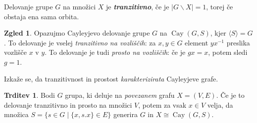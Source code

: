 \documentclass[11pt]{book}
\DeclareMathOperator\Cay{Cay}
\def\definicija{\color{rdeca}\bf\em}
\theoremstyle{definition}
\theoremstyle{zgled}
\newtheorem*{zgled}{Zgled}
\theoremstyle{odprtproblem}
\theoremstyle{domacanaloga}
\theoremstyle{izrek}
\newtheorem*{trditev}{Trditev}
\begin{document}
Delovanje grupe $G$ na množici $X$ je {\definicija tranzitivno}, če je $|G \backslash X| = 1$, torej če obstaja ena sama orbita.

\begin{zgled}
Opazujmo Cayleyjevo delovanje grupe $G$ na $\Cay(G,S)$, kjer $\langle S \rangle = G$. To delovanje je vselej {\em tranzitivno na vozliščih}: za $x,y \in G$ element $y x^{-1}$ preslika vozlišče $x$ v $y$. To delovanje je tudi {\em prosto na vozliščih}: če je $g x = x$, potem sledi $g = 1$.
\end{zgled}

Izkaže se, da tranzitivnost in prostost {\em karakterizirata} Cayleyjeve grafe.

\begin{trditev}
Bodi $G$ grupa, ki deluje na {\em povezanem} grafu $X = (V, E)$. Če je to delovanje tranzitivno in prosto na množici $V$, potem za vsak $x \in V$ velja, da množica $S = \{ s \in G \mid \{ x, s.x \} \in E \}$ generira $G$ in $X \cong \Cay(G, S)$.
\end{trditev}
\end{document}
